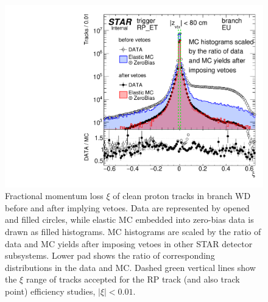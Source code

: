 \begin{figure}%
	\centering
	\parbox{0.4725\textwidth}{%
		\centering%
		\includegraphics[width=\linewidth,page=4]{graphics/systematicsEfficiency/RpSyst/xiPerBranch.pdf}%
	} 
	\quad
	\parbox{0.4725\textwidth}{ 
		\centering\vspace{67pt}
			\caption[Fractional momentum loss $\xi$ of clean proton tracks before and after implying vetoes in the data and MC (branch WD).]%
			{Fractional momentum loss $\xi$ of clean proton tracks in branch WD before and after implying vetoes. Data are represented by opened and filled circles, while elastic MC embedded into zero-bias data is drawn as filled histograms. MC histograms are scaled by the ratio of data and MC yields after imposing vetoes in other STAR detector subsystems. Lower pad shows the ratio of corresponding distributions in the data and MC. Dashed green vertical lines show the $\xi$ range of tracks accepted for the RP track (and also track point) efficiency studies, $|\xi|<0.01$.}\label{fig:rpSystXi_WD}%
	}
	
\end{figure}















